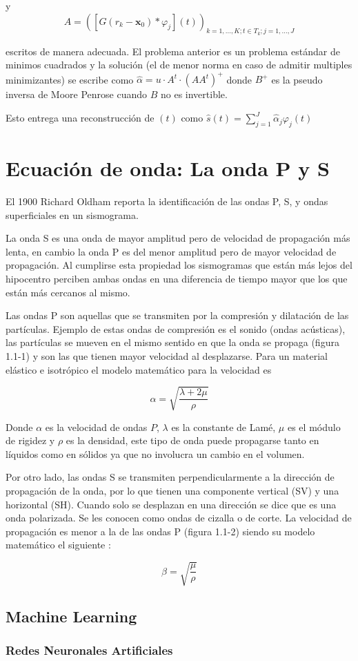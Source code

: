 y
$$A=\left(\left[G\left(r_{k}-\mathbf{x}_{0}\right)\ast\varphi_{j}\right]\left(t\right)\right)_{k=1,\ldots,K;t\in
T_{k};j=1,\ldots,J}$$
 

escritos de manera adecuada. El problema anterior es un problema estándar de
minimos cuadrados  y la solución (el de menor norma en caso de admitir multiples
minimizantes)  se escribe como $\hat{\alpha}=u\cdot
A^{t}\cdot\left(AA^{t}\right)^{+}$ donde $B^{+}$ es la pseudo inversa de Moore
Penrose cuando $B$ no es invertible.

Esto entrega una reconstrucción de $\left(t\right)$ como
$\hat{s}\left(t\right)=\sum_{j=1}^{J}\hat{\alpha}_{j}\varphi_{j}\left(t\right)$


\section{Ecuación de onda: La onda P y S}

El 1900 Richard Oldham reporta la identificación de las ondas P, S, y ondas
superficiales en un sismograma. 

La onda S es una onda de mayor amplitud pero de velocidad de propagación más
lenta, en cambio la onda P es del menor amplitud pero de mayor velocidad de
propagación. Al cumplirse esta propiedad los sismogramas que están más lejos del
hipocentro perciben ambas ondas en una diferencia de tiempo mayor que los que
están más cercanos al mismo.

Las ondas P son aquellas que se transmiten por la compresión y dilatación de las
partículas. Ejemplo de estas ondas de compresión es el sonido (ondas acústicas),
las partículas se mueven en el mismo sentido en que la onda se propaga (figura
1.1-1) y son las que tienen mayor velocidad al desplazarse. Para un material
elástico e isotrópico el modelo matemático para la velocidad es \cite{stein2009introduction}

$$\alpha = \sqrt{\frac{\lambda + 2\mu}{\rho}}$$

Donde $\alpha$ es la velocidad de ondas $P$, $\lambda$ es la constante de Lamé,
$\mu$ es el módulo de rigidez y $\rho$ es la densidad, este tipo de onda puede
propagarse tanto en líquidos como en sólidos ya que no involucra un cambio en el volumen.

Por otro lado, las ondas S se transmiten perpendicularmente a la dirección de
propagación de la onda, por lo que tienen una componente vertical (SV) y una
horizontal (SH). Cuando solo se desplazan en una dirección se dice que es una
onda polarizada. Se les conocen como ondas de cizalla o de corte. La velocidad
de propagación es menor a la de las ondas P (figura 1.1-2) siendo su modelo
matemático el siguiente \cite{stein2009introduction}:

$$\beta = \sqrt{\frac{\mu}{\rho}}$$

\subsection{Machine Learning}

\subsubsection{Redes Neuronales Artificiales} 




